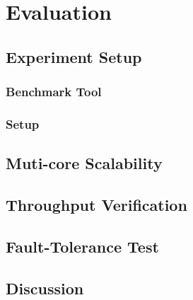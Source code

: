 \chapter{Evaluation}\label{ch5}

\section{Experiment Setup}

\subsection{Benchmark Tool}

\subsection{Setup}

\section{Muti-core Scalability}

\section{Throughput Verification}

\section{Fault-Tolerance Test}

\section{Discussion}